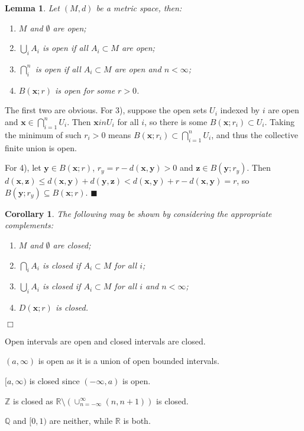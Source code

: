 \documentclass[letter-paper]{tufte-book}
\newtheorem{lemma}[theorem]{\color{pastel-blue}Lemma}
\newtheorem{corollary}[theorem]{\color{pastel-blue}Corollary}
\newenvironment{proof}[1][Proof]{\begin{trivlist}
\item[\hskip \labelsep {\bfseries #1}]}{\end{trivlist}}
\newenvironment{example}[1][Example]{\begin{trivlist}
\item[\hskip \labelsep {\bfseries #1}]}{\end{trivlist}}
\newcommand{\xb}{\boldsymbol{x}}
\newcommand{\yb}{\boldsymbol{y}}
\newcommand{\zb}{\boldsymbol{z}}
\newcommand{\qed}{\hfill$\blacksquare$}
\newcommand{\qedwhite}{\hfill \ensuremath{\Box}}
\begin{document}
\begin{lemma}
Let $(M, d)$ be a metric space, then:
  \begin{enumerate}
    \item $M$ and $\emptyset$ are open;
    \item $\bigcup_i A_i$ is open if all $A_i \subset M$ are open;
    \item $\bigcap_i^n$ is open if all $A_i \subset M$ are open and $n <
    \infty$;
    \item $B(\xb; r)$ is open for some $r > 0$.
  \end{enumerate}
\end{lemma}

\begin{proof}
  The first two are obvious. For 3), suppose the open sets $U_i$ indexed by $i$
  are open and $\xb \in \bigcap_{i=1}^n U_i$. Then $\xb in U_i$ for all $i$, so
  there is some $B(\xb; r_i) \subset U_i$. Taking the minimum of such $r_i > 0$
  means $B(\xb; r_i) \subset \bigcap_{i=1}^n U_i$, and thus the collective
  finite union is open.
  
  For 4), let $\yb \in B(\xb; r)$, $r_y = r - d(\xb, \yb) > 0$ and $\zb \in
  B(\yb; r_y)$. Then $d(\xb, \zb) \leq d(\xb, \yb) + d(\yb, \zb) < d(\xb, \yb) +
  r - d(\xb, \yb) = r$, so $B(\yb; r_y) \subseteq B(\xb; r)$. \qed
\end{proof}

\begin{corollary}
The following may be shown by considering the appropriate complements:
  \begin{enumerate}
    \item $M$ and $\emptyset$ are closed;
    \item $\bigcap_i A_i$ is closed if $A_i \subset M$ for all $i$;
    \item $\bigcup_i A_i$ is closed if $A_i \subset M$ for all $i$ and $n <
    \infty$;
    \item $D(\xb; r)$ is closed.
  \end{enumerate}
  \qedwhite
\end{corollary}

\begin{example}
  Open intervals are open and closed intervals are closed.
  
  $(a, \infty)$ is open as it is a union of open bounded intervals.
  
  $[a, \infty)$ is closed since $(-\infty, a)$ is open.
  
  $\mathbb{Z}$ is closed as $\mathbb{R} \setminus \left(\cup_{n=-\infty}^\infty
  (n, n+1)\right)$ is closed.
  
  $\mathbb{Q}$ and $[0, 1)$ are neither, while $\mathbb{R}$ is both.
\end{example}
\end{document}

